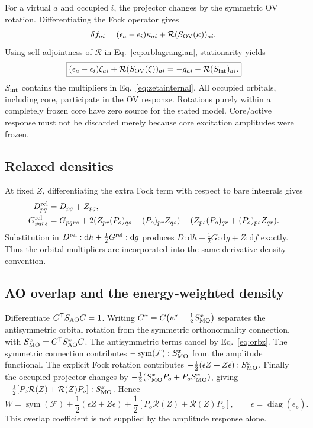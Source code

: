 \documentclass[11pt,letterpaper]{article}
\numberwithin{equation}{section}
\newcommand{\T}{\mathsf T}
\newcommand{\dd}{\mathrm d}
\newcommand{\sym}{\operatorname{sym}}
\newcommand{\diag}{\operatorname{diag}}
\begin{document}
For a virtual $a$ and occupied $i$, the projector changes by the symmetric
OV rotation. Differentiating the Fock operator gives
\begin{equation}
 \delta f_{ai}=(\epsilon_a-\epsilon_i)\kappa_{ai}
                              +\mathcal R(S_{\rm OV}(\kappa))_{ai}.
\end{equation}
Using self-adjointness of $\mathcal R$ in Eq.~\eqref{eq:orblagrangian},
stationarity yields
\begin{equation}
 \boxed{(\epsilon_a-\epsilon_i)\zeta_{ai}
  +\mathcal R(S_{\rm OV}(\zeta))_{ai}
       =-g_{ai}-\mathcal R(S_{\rm int})_{ai}.}
 \label{eq:orbz}
\end{equation}
$S_{\rm int}$ contains the multipliers in Eq.~\eqref{eq:zetainternal}.
All occupied orbitals, including core, participate in the OV response.
Rotations purely within a completely frozen core have zero source for the
stated model. Core/active response must not be discarded merely because
core excitation amplitudes were frozen.

\subsection{Relaxed densities}
At fixed $Z$, differentiating the extra Fock term with respect to bare
integrals gives
\begin{align}
 D^{\rm rel}_{pq}&=D_{pq}+Z_{pq},\\
 G^{\rm rel}_{pqrs}&=G_{pqrs}
   +2(Z_{pr}(P_o)_{qs}+(P_o)_{pr}Z_{qs})
   -(Z_{ps}(P_o)_{qr}+(P_o)_{ps}Z_{qr}).
 \label{eq:relaxeddensities}
\end{align}
Substitution in $D^{\rm rel}:\dd h+\tfrac12G^{\rm rel}:\dd g$
produces $D:\dd h+\tfrac12G:\dd g+Z:\dd f$ exactly. Thus the orbital
multipliers are incorporated into the same derivative-density convention.

\subsection{AO overlap and the energy-weighted density}
Differentiate $C^{\T}S_{\rm AO}C=\mathbf1$. Writing
$C^x=C\bigl(\kappa^x-\tfrac12S^x_{\rm MO}\bigr)$ separates the antisymmetric
orbital rotation from the symmetric orthonormality connection, with
$S^x_{\rm MO}=C^{\T}S^x_{\rm AO}C$. The antisymmetric terms cancel by
Eq.~\eqref{eq:orbz}. The symmetric connection contributes
$-\sym(\mathcal F):S^x_{\rm MO}$ from the amplitude functional.
The explicit Fock rotation contributes
$-\tfrac12(\epsilon Z+Z\epsilon):S^x_{\rm MO}$.
Finally the occupied projector changes by
$-\tfrac12(S^x_{\rm MO}P_o+P_oS^x_{\rm MO})$, giving
$-\tfrac12[P_o\mathcal R(Z)+\mathcal R(Z)P_o]:S^x_{\rm MO}$.
Hence
\begin{equation}
 W=\sym(\mathcal F)+\frac12(\epsilon Z+Z\epsilon)
            +\frac12[P_o\mathcal R(Z)+\mathcal R(Z)P_o],
 \qquad \epsilon=\diag(\epsilon_p).
 \label{eq:weighted}
\end{equation}
This overlap coefficient is not supplied by the amplitude response alone.
\end{document}
